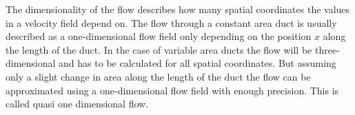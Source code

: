 	The dimensionality of the flow describes how many spatial coordinates the values in a velocity field depend on.
	The flow through a constant area duct is usually described as a one-dimensional flow field only depending on the position $x$ along the length of the duct.
	In the case of variable area ducts the flow will be three-dimensional and has to be calculated for all spatial coordinates.
	But assuming only a slight change in area along the length of the duct the flow can be approximated using a one-dimensional flow field with enough precision.
	This is called quasi one dimensional flow. \cite{anderson2021modern}
